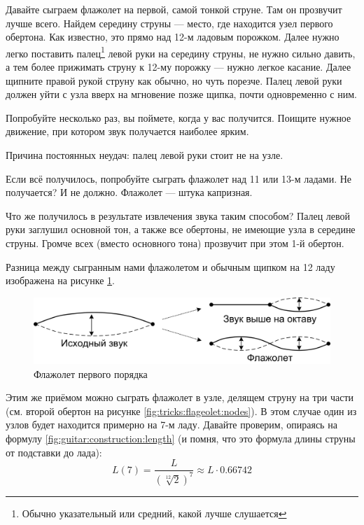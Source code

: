 \begin{Example}
    Давайте сыграем флажолет на первой, самой тонкой струне. Там он прозвучит лучше всего. Найдем середину струны --- место, где находится узел первого обертона. Как известно, это прямо над 12-м ладовым порожком. Далее нужно легко поставить палец\footnote{Обычно указательный или средний, какой лучше слушается} левой руки на середину струны, не нужно сильно давить, а тем более прижимать струну к 12-му порожку --- нужно легкое касание. Далее щипните правой рукой струну как обычно, но чуть порезче. Палец левой руки должен уйти с узла вверх на мгновение позже щипка, почти одновременно с ним.
    
    Попробуйте несколько раз, вы поймете, когда у вас получится. Поищите нужное движение, при котором звук получается наиболее ярким.
    
    Причина постоянных неудач: палец левой руки стоит не на узле. 
    
    Если всё получилось, попробуйте сыграть флажолет над 11 или 13-м ладами. Не получается? И не должно. Флажолет --- штука капризная.
    
    Что же получилось в результате извлечения звука таким способом? Палец левой руки заглушил основной тон, а также все обертоны, не имеющие узла в середине струны. Громче всех (вместо основного тона) прозвучит при этом 1-й обертон.
    
    Разница между сыгранным нами флажолетом и обычным щипком на 12 ладу изображена на рисунке \ref{fig:tricks:flageolet:first}.
\end{Example}
 
\begin{figure}[!ht]
    \centering
    \includegraphics{fig/string-flageolet} 
    \caption{Флажолет первого порядка}\label{fig:tricks:flageolet:first}
\end{figure} 

Этим же приёмом можно сыграть флажолет в узле, делящем струну на три части (см. второй обертон на рисунке \ref{fig:tricks:flageolet:nodes}). В этом случае один из узлов будет находится примерно на 7-м ладу. Давайте проверим, опираясь на формулу \ref{fig:guitar:construction:length} (и помня, что это формула длины струны от подставки до лада):
\[
    L(7)=\frac{L}{(\sqrt[12]{2})^7}\approx L\cdot 0.66742
\]

